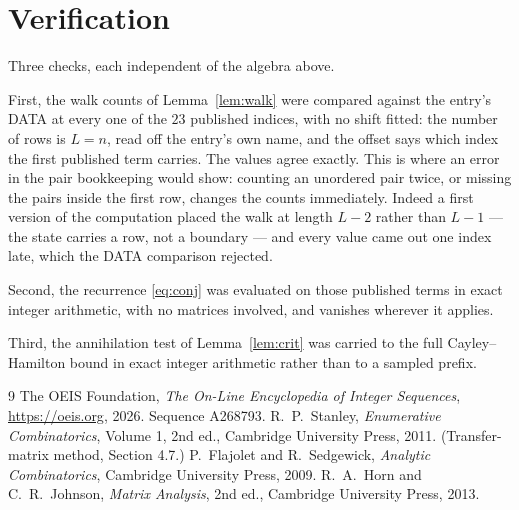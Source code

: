 \documentclass[11pt,a4paper]{article}
\theoremstyle{plain}
\theoremstyle{definition}
\begin{document}
\section{Verification}

Three checks, each independent of the algebra above.

First, the walk counts of Lemma~\ref{lem:walk} were compared against the entry's DATA at
every one of the $23$ published indices, with no shift fitted: the number of rows is
$L=n$, read off the entry's own name, and the offset says which index the first
published term carries. The values agree exactly. This is where an error in the pair
bookkeeping would show: counting an unordered pair twice, or missing the pairs inside the
first row, changes the counts immediately. Indeed a first version of the computation
placed the walk at length $L-2$ rather than $L-1$ --- the state carries a row, not a
boundary --- and every value came out one index late, which the DATA comparison rejected.

Second, the recurrence \eqref{eq:conj} was evaluated on those published terms in exact
integer arithmetic, with no matrices involved, and vanishes wherever it applies.

Third, the annihilation test of Lemma~\ref{lem:crit} was carried to the full
Cayley--Hamilton bound in exact integer arithmetic rather than to a sampled prefix.

\begin{thebibliography}{9}
 The OEIS Foundation, \emph{The On-Line Encyclopedia of Integer
Sequences}, \url{https://oeis.org}, 2026. Sequence A268793.
 R.~P.~Stanley, \emph{Enumerative Combinatorics}, Volume 1, 2nd ed.,
Cambridge University Press, 2011. (Transfer-matrix method, Section 4.7.)
 P.~Flajolet and R.~Sedgewick, \emph{Analytic Combinatorics}, Cambridge
University Press, 2009.
 R.~A.~Horn and C.~R.~Johnson, \emph{Matrix Analysis}, 2nd ed., Cambridge
University Press, 2013.
\end{thebibliography}
\end{document}
